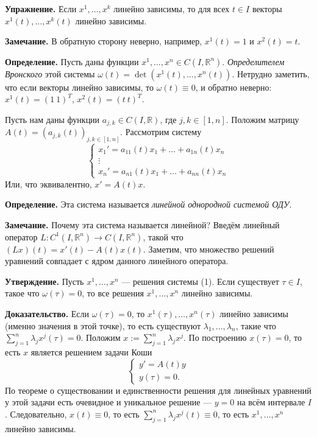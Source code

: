 \textbf{Упражнение.} Если $x^1, \dots, x^k$ линейно зависимы, то для всех $t \in I$ векторы $x^1(t), \dots, x^k(t)$ линейно зависимы.

\textbf{Замечание.} В обратную сторону неверно, например, $x^1(t) = 1$ и $x^2(t) = t$.

\textbf{Определение.} Пусть даны функции $x^1, \dots, x^n \in C(I, \mathbb R^n)$.
\textit{Определителем Вронского} этой системы $\omega(t) = \det(x^1(t), \dots, x^n(t))$.
Нетрудно заметить, что если векторы линейно зависимы, то $\omega(t) \equiv 0$, и обратно неверно: $x^1(t) = (1~1)^T$, $x^2(t) = (t~t)^T$.

Пусть нам даны функции $a_{j,k} \in C(I, \mathbb R)$, где $j, k \in [1, n]$.
Положим матрицу $A(t) = (a_{j,k}(t))_{j,k \in [1, n]}$.
Рассмотрим систему
\begin{equation}
    \begin{cases}
        x_1' = a_{11}(t)x_1 + \dots + a_{1n}(t)x_n \\
        \vdots \\
        x_n' = a_{n1}(t)x_1 + \dots + a_{nn}(t)x_n
    \end{cases}
\end{equation}
Или, что эквивалентно, $x' = A(t)x$.

\textbf{Определение.} Эта система называется \textit{линейной однородной системой ОДУ}.

\textbf{Замечание.} Почему эта система называется линейной? Введём линейный оператор $L: C^1(I, \mathbb R^n) \to C(I, \mathbb R^n)$, такой что $(Lx)(t) = x'(t) - A(t)x(t)$.
Заметим, что множество решений уравнений совпадает с ядром данного линейного оператора.

\textbf{Утверждение.} Пусть $x^1, \dots, x^n$ --- решения системы (1). Если существует $\tau \in I$, такое что $\omega(\tau) = 0$, то все решения $x^1, \dots, x^n$ линейно зависимы.

\textbf{Доказательство.} Если $\omega(\tau) = 0$, то $x^1(\tau), \dots, x^n(\tau)$ линейно зависимы (именно значения в этой точке), то есть существуют $\lambda_1, \dots, \lambda_n$, такие что $\sum_{j=1}^{n} \lambda_j x^j(\tau) = 0$.
Положим $x := \sum_{j=1}^{n} \lambda_j x^j$.
По построению $x(\tau) = 0$, то есть $x$ является решением задачи Коши
\[
    \begin{cases}
        y' = A(t)y \\
        y(\tau) = 0.
    \end{cases}
\]
По теореме о существовании и единственности решения для линейных уравнений у этой задачи есть очевидное и уникальное решение --- $y = 0$ на всём интервале $I$.
Следовательно, $x(t) \equiv 0$, то есть $\sum_{j=1}^{n} \lambda_jx^j(t) \equiv 0$, то есть $x^1, \dots, x^n$ линейно зависимы.

